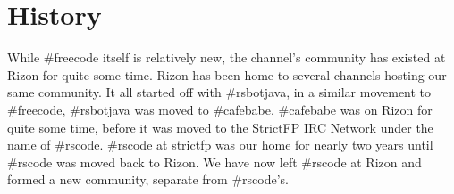 \documentclass[11pt,a4paper,notitlepage]{article}
\begin{document}
\section{History}
While \#freecode itself is relatively new, the channel's community has existed at Rizon for quite some time.
Rizon has been home to several channels hosting our same community.
It all started off with \#rsbotjava, in a similar movement to \#freecode, \#rsbotjava was moved to \#cafebabe.
\#cafebabe was on Rizon for quite some time, before it was moved to the StrictFP IRC Network under the name of \#rscode.
\#rscode at strictfp was our home for nearly two years until \#rscode was moved back to Rizon.
We have now left \#rscode at Rizon and formed a new community, separate from \#rscode's.
\end{document}
